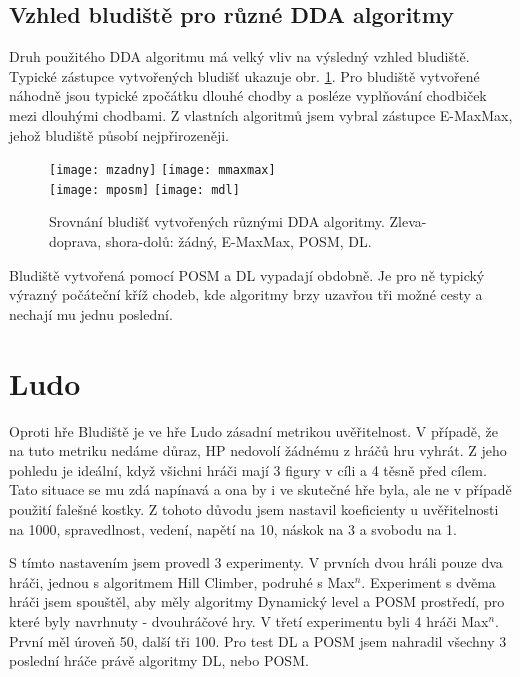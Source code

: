 \subsection{Vzhled bludiště pro různé DDA algoritmy}

Druh použitého DDA algoritmu má velký vliv na výsledný vzhled bludiště. Typické zástupce vytvořených bludišť ukazuje obr. \ref{fig-mazes}. Pro bludiště vytvořené náhodně jsou typické zpočátku dlouhé chodby a posléze vyplňování chodbiček mezi dlouhými chodbami. Z vlastních algoritmů jsem vybral zástupce E-MaxMax, jehož bludiště působí nejpřirozeněji.

\begin{figure}
  \centering
  \texttt{[image: mzadny]}
	\hspace{3pt}
	\texttt{[image: mmaxmax]} \\
	\vspace{6pt}
	\texttt{[image: mposm]}
	\hspace{3pt}
	\texttt{[image: mdl]}
	\caption{Srovnání bludišť vytvořených různými DDA algoritmy. Zleva-doprava, shora-dolů: žádný, E-MaxMax, POSM, DL.}
	\label{fig-mazes}
\end{figure}

Bludiště vytvořená pomocí POSM a DL vypadají obdobně. Je pro ně typický výrazný počáteční kříž chodeb, kde algoritmy brzy uzavřou tři možné cesty a nechají mu jednu poslední.

\section{Ludo}

Oproti hře Bludiště je ve hře Ludo zásadní metrikou uvěřitelnost. V případě, že na tuto metriku nedáme důraz, HP nedovolí žádnému z hráčů hru vyhrát. Z jeho pohledu je ideální, když všichni hráči mají 3 figury v cíli a 4 těsně před cílem. Tato situace se mu zdá napínavá a ona by i ve skutečné hře byla, ale ne v případě použití falešné kostky. Z tohoto důvodu jsem nastavil koeficienty u uvěřitelnosti na 1000, spravedlnost, vedení, napětí na 10, náskok na 3 a svobodu na 1.

S tímto nastavením jsem provedl 3 experimenty. V prvních dvou hráli pouze dva hráči, jednou s algoritmem Hill Climber, podruhé s Max$^n$. Experiment s dvěma hráči jsem spouštěl, aby měly algoritmy Dynamický level a POSM prostředí, pro které byly navrhnuty - dvouhráčové hry. V třetí experimentu byli 4 hráči Max$^n$. První měl úroveň 50, další tři 100. Pro test DL a POSM jsem nahradil všechny 3 poslední hráče právě algoritmy DL, nebo POSM.

